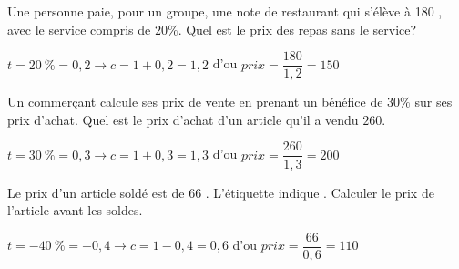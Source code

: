 \documentclass[11pt,a4paper]{article}  %
\begin{document}
\begin{enumMet}
	\item Une personne paie, pour un groupe, une note de restaurant qui s'élève à 180 \EUR{}, avec le service compris de $20 \%$. Quel est le prix des repas sans le service?
	\begin{corrBox}
		$t=20\ \%=0,2\longrightarrow c=1+0,2=1,2$ d'ou $prix=\dfrac{180}{1,2}=150$ \EUR{}		
	\end{corrBox}
	\item {} Un commerçant calcule ses prix de vente en prenant un bénéfice de $30 \%$ sur ses prix d'achat. Quel est le prix d'achat d'un article qu'il a vendu $260$\EUR{}.
	\begin{corrBox}
		$t=30\ \%=0,3\longrightarrow c=1+0,3=1,3$ d'ou $prix=\dfrac{260}{1,3}=200$ \EUR{}		
	\end{corrBox}
	\item Le prix d'un article soldé est de $66$ \EUR{}. L'étiquette indique . Calculer le prix de l'article avant les soldes.
	\begin{corrBox}
		$t=-40\ \%=-0,4\longrightarrow c=1-0,4=0,6$ d'ou $prix=\dfrac{66}{0,6}=110$ \EUR{}		
	\end{corrBox}
\end{enumMet}
\end{document}
